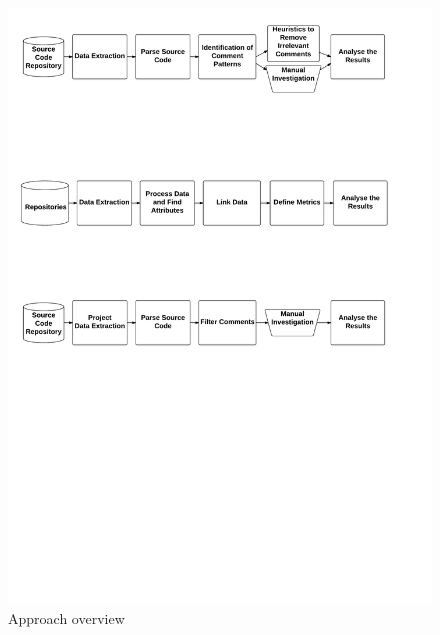 \begin{figure}[thb!]
  \centering
  \includegraphics[width=1\textwidth]{figures/Approach}
  \caption{Approach overview}
  \label{fig:approach}
\end{figure}

